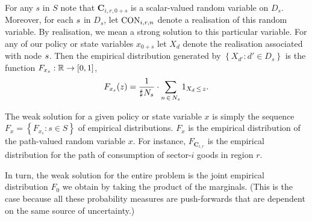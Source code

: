 \documentclass[12pt,a4paper,twoside, draft]{article}
\begin{document}
For any $s$ in $S$ note that $\mathbf{C}_{i, r, \mathfrak{0} + s}$ is a
scalar-valued random variable on $D_s$. 
Moreover, for each ${s}$ in $D_s$, let $\textup{CON}_{i, r, n}$ denote a
realisation of this random variable.
By realisation, we mean a strong solution to this particular variable.
For any of our policy or state variables $x_{\mathfrak{0}+s}$ let $X_d$ denote
the realisation associated with node ${s}$.
Then the empirical distribution generated by $\left\{X_{d'}: d' \in D_s\right\}$ is
the function
$F_{x_{s}} : \mathbb R \rightarrow [0, 1]$,
\begin{equation}\label{eq-empirical-dbn}
   F_{x_s}(z) = \frac{1}{\mathbin{\sharp}\hskip1pt N_{s}}
   \cdot \sum_{n \,\in\, N_{s}} 1_{X_d \,\leq\, z}.
\end{equation}

The weak solution for a given policy or state variable $x$ is simply the
sequence $F_{x} = \left\{F_{x_{s}}: s \in S\right\}$ of empirical distributions.
$F_{x}$ is the empirical distribution of the path-valued random variable $x$.
For instance, $F_{\mathbf{C}_{i, r}}$ is the empirical distribution for the
path of consumption of sector-$i$ goods in region $r$.

In turn, the weak solution for the entire problem is the joint empirical
distribution $F_{\mathfrak{0}}$ we obtain by taking the product of the
marginals.
(This is the case because all these probability measures are push-forwards that
are dependent on the same source of uncertainty.)
\end{document}
